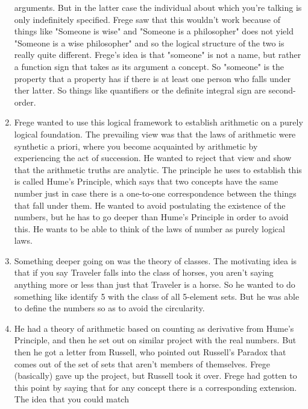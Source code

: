 \documentclass[12pt]{article}
\theoremstyle{definition}
\begin{document}
\begin{enumerate}
        arguments. But in the latter case the individual about which you're
        talking is only indefinitely specified. Frege saw that this wouldn't
        work because of things like "Someone is wise" and "Someone is a
        philosopher" does not yield "Someone is a wise philosopher" and so the
        logical structure of the two is really quite different. Frege's idea is
        that "someone" is not a name, but rather a function sign that takes as
        its argument a concept. So "someone" is the property that a property
        has if there is at least one person who falls under ther latter. So
        things like quantifiers or the definite integral sign are second-order.
    \item
        Frege wanted to use this logical framework to establish arithmetic on a
        purely logical foundation. The prevailing view was that the laws of
        arithmetic were synthetic a priori, where you become acquainted by
        arithmetic by experiencing the act of succession. He wanted to reject
        that view and show that the arithmetic truths are analytic. The
        principle he uses to establish this is called Hume's Principle, which
        says that two concepts have the same number just in case there is a
        one-to-one correspondence between the things that fall under them. He
        wanted to avoid postulating the existence of the numbers, but he has to
        go deeper than Hume's Principle in order to avoid this. He wants to be
        able to think of the laws of number as purely logical laws.
    \item
        Something deeper going on was the theory of classes. The motivating
        idea is that if you say Traveler falls into the class of horses, you
        aren't saying anything more or less than just that Traveler is a
        horse. So he wanted to do something like identify 5 with the class of
        all 5-element sets. But he was able to define the numbers so as to
        avoid the circularity.
    \item
        He had a theory of arithmetic based on counting as derivative from
        Hume's Principle, and then he set out on similar project with the real
        numbers. But then he got a letter from Russell, who pointed out
        Russell's Paradox that comes out of the set of sets that aren't members
        of themselves. Frege (basically) gave up the project, but Russell took
        it over. Frege had gotten to this point by saying that for any concept
        there is a corresponding extension. The idea that you could match

\end{enumerate}
\end{document}
